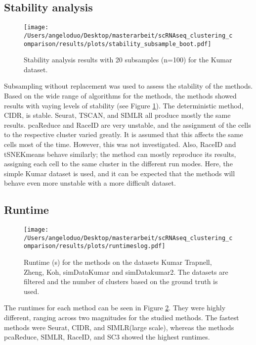 \documentclass[12pt, a4paper]{article}\usepackage[]{graphicx}\usepackage[]{color}
\begin{document}
\subsection{Stability  analysis}
\begin{figure}[!h]
\texttt{[image: /Users/angeloduo/Desktop/masterarbeit/scRNAseq\_clustering\_comparison/results/plots/stability\_subsample\_boot.pdf]}
\caption{Stability analysis results with 20 subsamples (n=100) for the Kumar dataset.}
\label{fig:stab}
\end{figure}

Subsampling without replacement was used to assess the stability of the methods. Based on the wide range of algorithms for the methods, the methods showed results with vaying levels of stability (see Figure \ref{fig:stab}). The deterministic method, CIDR, is stable. Seurat, TSCAN, and SIMLR all produce mostly the same results. pcaReduce and RaceID are very unstable, and the assignment of the cells to the respective cluster varied greatly. It is assumed that this affects the same cells most of the time. However, this was not investigated. Also, RaceID and tSNEKmeans behave similarly; the method can mostly reproduce its results, assigning each cell to the same cluster in the different run modes. Here, the simple Kumar dataset is used, and it can be expected that the methods will behave even more unstable with a more difficult dataset.  
\newpage

\subsection{Runtime} 

\begin{figure}[htp]
\begin{center}
\texttt{[image: /Users/angeloduo/Desktop/masterarbeit/scRNAseq\_clustering\_comparison/results/plots/runtimeslog.pdf]}
\caption{Runtime (s) for the methods on the datasets Kumar Trapnell, Zheng, Koh, simDataKumar and simDatakumar2. The datasets are filtered and the number of clusters based on the ground truth is used.}
\label{fig:runtimelog}
\end{center}
\end{figure}

The runtimes for each method can be seen in Figure \ref{fig:runtimelog}. They were highly different, ranging across two magnitudes for the studied methods. The fastest methods were Seurat, CIDR, and SIMLR(large scale), whereas the methods pcaReduce, SIMLR, RaceID, and SC3 showed the highest runtimes. 
\end{document}
